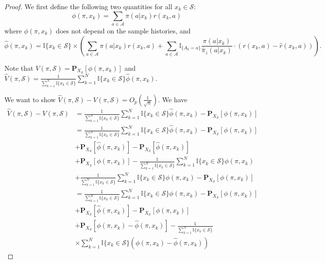 \begin{proof}
We first define the following two quantities for all $x_k \in \mathcal{S}$:
$$\phi(\pi, x_k) = \sum_{a \in \mathcal{A}} \pi(a|x_k) r(x_k, a)$$ where $\phi(\pi, x_k)$ does not depend on the sample histories, and  $$\widehat{\phi}(\pi, x_k) = \mathbb{I}{\{x_k \in \mathcal{S} \}} \times \left(\sum_{a \in \mathcal{A}} \pi(a|x_k)\hat{r}(x_k, a) + \sum_{a \in \mathcal{A}} \mathbb{I}_{\{A_k = a\}}\frac{\pi(a|x_k)}{\hat{\pi}_{z}(a|x_k)} \cdot (r(x_k, a) - \hat{r}(x_k, a)) \right).$$

Note that $V(\pi, \mathcal{S}) = \mathbf{P}_{X_\mathcal{S}} \left[ \phi(\pi, x_k) \right]$ and 
$\widehat{V}(\pi, \mathcal{S})  = \frac{1}{\sum_{k=1}^N \mathbb{I}{\{x_k \in \mathcal{S} \}}}  \sum_{k=1}^{N } \mathbb{I}{\{x_k \in \mathcal{S} \}} \widehat{\phi}(\pi, x_k)$.

We want to show $\widehat{V}(\pi, \mathcal{S}) - V(\pi, \mathcal{S}) = O_p(\frac{1}{\sqrt{n}})$. We have
\begin{align}
\widehat{V}(\pi, \mathcal{S}) - V(\pi, \mathcal{S}) &= \frac{1}{\sum_{k=1}^N \mathbb{I}{\{x_k \in \mathcal{S} \}}}  \sum_{k=1}^{N } \mathbb{I}{\{x_k \in \mathcal{S} \}} \widehat{\phi}(\pi, x_k) - \mathbf{P}_{X_\mathcal{S}} \left[ \phi(\pi, x_k) \right] \nonumber \\
&= \frac{1}{\sum_{k=1}^N \mathbb{I}{\{x_k \in \mathcal{S} \}}}  \sum_{k=1}^{N } \mathbb{I}{\{x_k \in \mathcal{S} \}} \widehat{\phi} (\pi, x_k) - \mathbf{P}_{X_\mathcal{S}} \left[ \phi(\pi, x_k) \right]  \nonumber \\
&+ \mathbf{P}_{X_\mathcal{S}} \left[ \widehat{\phi}(\pi, x_k) \right] - \mathbf{P}_{X_\mathcal{S}} \left[ \widehat{\phi}(\pi, x_k) \right] \nonumber \\
&+ \mathbf{P}_{X_\mathcal{S}} \left[ \phi(\pi, x_k) \right] - \frac{1}{\sum_{k=1}^N \mathbb{I}{\{x_k \in \mathcal{S} \}}}  \sum_{k=1}^{N } \mathbb{I}{\{x_k \in \mathcal{S} \}} \phi(\pi, x_k)   \nonumber \\
&+\frac{1}{\sum_{k=1}^N \mathbb{I}{\{x_k \in \mathcal{S} \}}}  \sum_{k=1}^{N } \mathbb{I}{\{x_k \in \mathcal{S} \}} \phi(\pi, x_k)  - \mathbf{P}_{X_\mathcal{S}} \left[ \phi(\pi, x_k) \right] \nonumber \\
&= \frac{1}{\sum_{k=1}^N \mathbb{I}{\{x_k \in \mathcal{S} \}}}  \sum_{k=1}^{N } \mathbb{I}{\{x_k \in \mathcal{S} \}} \phi(\pi, x_k)  - \mathbf{P}_{X_\mathcal{S}} \left[ \phi(\pi, x_k) \right] \label{eq1}\\
&+ \mathbf{P}_{X_\mathcal{S}} \left[ \widehat{\phi}(\pi, x_k) \right] - \mathbf{P}_{X_\mathcal{S}} \left[ \phi(\pi, x_k) \right]  \label{eq2}\\
&+ \mathbf{P}_{X_\mathcal{S}} \left[ \phi(\pi, x_k) - \widehat{\phi}(\pi, x_k) \right] - \frac{1}{\sum_{k=1}^N \mathbb{I}{\{x_k \in \mathcal{S} \}}}  \nonumber  \\
&\times \sum_{k=1}^{N }\mathbb{I}{\{x_k \in \mathcal{S} \}} \left(\phi(\pi, x_k) - \widehat{\phi} (\pi, x_k) \right)\label{eq3}
\end{align}


\end{proof}
